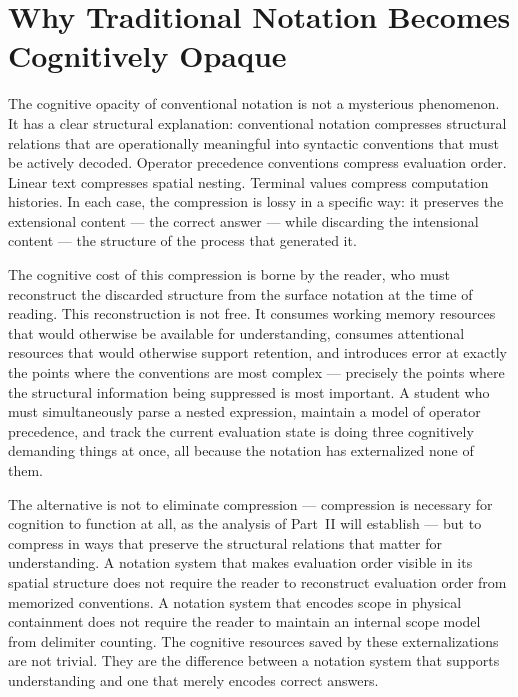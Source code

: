 \documentclass[12pt,openany]{book}
\theoremstyle{plain}
\theoremstyle{definition}
\theoremstyle{remark}
\begin{document}
\section*{Why Traditional Notation Becomes Cognitively Opaque}

The cognitive opacity of conventional notation is not a mysterious phenomenon. It has a clear structural explanation: conventional notation compresses structural relations that are operationally meaningful into syntactic conventions that must be actively decoded. Operator precedence conventions compress evaluation order. Linear text compresses spatial nesting. Terminal values compress computation histories. In each case, the compression is lossy in a specific way: it preserves the extensional content — the correct answer — while discarding the intensional content — the structure of the process that generated it.

The cognitive cost of this compression is borne by the reader, who must reconstruct the discarded structure from the surface notation at the time of reading. This reconstruction is not free. It consumes working memory resources that would otherwise be available for understanding, consumes attentional resources that would otherwise support retention, and introduces error at exactly the points where the conventions are most complex — precisely the points where the structural information being suppressed is most important. A student who must simultaneously parse a nested expression, maintain a model of operator precedence, and track the current evaluation state is doing three cognitively demanding things at once, all because the notation has externalized none of them.

The alternative is not to eliminate compression — compression is necessary for cognition to function at all, as the analysis of Part~II will establish — but to compress in ways that preserve the structural relations that matter for understanding. A notation system that makes evaluation order visible in its spatial structure does not require the reader to reconstruct evaluation order from memorized conventions. A notation system that encodes scope in physical containment does not require the reader to maintain an internal scope model from delimiter counting. The cognitive resources saved by these externalizations are not trivial. They are the difference between a notation system that supports understanding and one that merely encodes correct answers.
\end{document}
